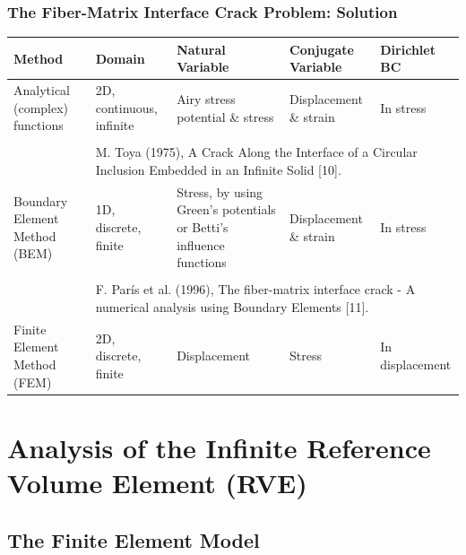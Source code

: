 \documentclass[first,firstsupp,lastsupp,last,hyperref,table]{ETHclass}
\begin{document}
\begin{frame}
\frametitle{\small The Fiber-Matrix Interface Crack Problem: Solution}
\vspace{-0.5cm}
\centering
\footnotesize
\begin{table}
\begin{tabularx}{\columnwidth}{p{}Xp{}XX}
{\tiny \bf{Method}}&{\tiny \bf{Domain}}&{\tiny \bf{Natural Variable}}&{\tiny \bf{Conjugate Variable}}&{\tiny \bf{Dirichlet BC}}\\
\toprule
{\tiny Analytical (complex) functions}&{\tiny 2D, continuous, infinite}&{\tiny Airy stress potential \& stress}&{\tiny Displacement \& strain}&{\tiny In stress}\\[10pt]
\cline{2-5}\\[-10pt]
&\multicolumn{4}{p{0.7\textwidth}}{\tiny M. Toya (1975), A Crack Along the Interface of a Circular Inclusion Embedded in an Infinite Solid [10].}\\
\bottomrule
{\tiny Boundary Element Method (BEM)}&{\tiny 1D, discrete, finite}&{\tiny Stress, by using Green's potentials or Betti's influence functions}&{\tiny Displacement \& strain}&{\tiny In stress}\\[10pt]
\cline{2-5}\\[-10pt]
&\multicolumn{4}{p{0.7\textwidth}}{\tiny F. Par\'is et al. (1996), The fiber-matrix interface crack - A numerical analysis using Boundary Elements [11].}\\
\bottomrule
{\tiny Finite Element Method (FEM)}&{\tiny 2D, discrete, finite}&{\tiny Displacement}&{\tiny Stress}&{\tiny In displacement}\\[10pt]
\bottomrule
\end{tabularx}
\end{table}
\end{frame}

\section[Analysis of the Infinite RVE]{Analysis of the Infinite Reference Volume Element (RVE)}

\subsection{The Finite Element Model}
\end{document}
